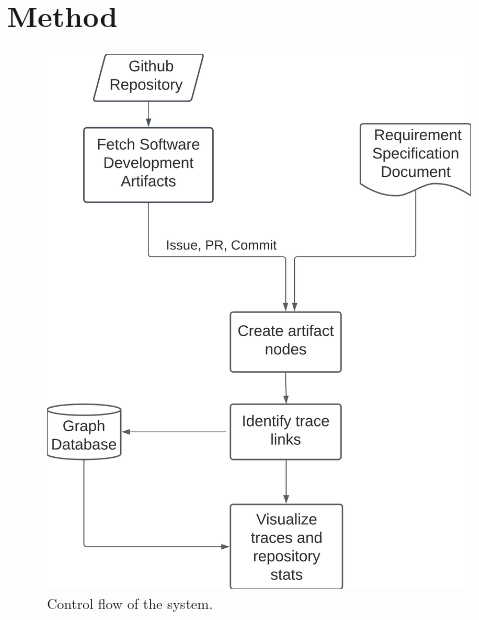\section{Method}
\label{sec:approach}

\begin{figure}[htb]
    \centering
    \includegraphics[width=0.65\linewidth]{figs/toolflow.png}
    \caption{Control flow of the system.}
    \label{fig:sys-flow}
\end{figure}

